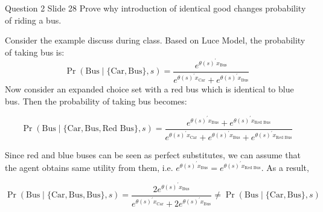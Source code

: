 \documentclass{article}
\begin{document}
\begin{problem}{Question 2 Slide 28}
Prove why introduction of identical good changes probability of riding a bus.
\end{problem}
\begin{solution}
Consider the example discuss during class. Based on Luce Model, the probability of taking bus is:
\begin{equation*}
\operatorname{Pr}(\text{Bus} \mid\{\text{Car},\text{Bus}\}, s)=\frac{e^{\theta(s)^{\prime} x_{\text{Bus}}}}{e^{\theta(s)^{\prime} x_{\text{Car}}}+e^{\theta(s)^{\prime} x_{\text{Bus}}}}
\end{equation*}
Now consider an expanded choice set with a red bus which is identical to blue bus. Then the probability of taking bus becomes:

\begin{equation*}
\operatorname{Pr}(\text{Bus} \mid\{\text{Car},\text{Bus},\text{Red Bus}\}, s)=\frac{e^{\theta(s)^{\prime} x_{\text{Bus}}}+e^{\theta(s)^{\prime} x_{\text{Red Bus}}}}{e^{\theta(s)^{\prime} x_{\text{Car}}}+e^{\theta(s)^{\prime} x_{\text{Bus}}}+e^{\theta(s)^{\prime} x_{\text{Red Bus}}}}
\end{equation*}

Since red and blue buses can be seen as perfect substitutes, we can assume that the agent obtains same utility from them, i.e. $e^{\theta(s)^{\prime} x_{\text{Bus}}}=e^{\theta(s)^{\prime} x_{\text{Red Bus}}}$. As a result,

\begin{equation*}
\operatorname{Pr}(\text{Bus}\mid\{\text{Car},\text{Bus},\text{Bus}\}, s)=\frac{2 e^{\theta(s)^{\prime} x_{\text{Bus}}}}{e^{\theta(s)^{\prime} x_{\text{Car}}}+2 e^{\theta(s)^{\prime} x_{\text{Bus}}}} \neq \operatorname{Pr}(\text{Bus} \mid\{\text{Car},\text{Bus}\}, s)
\end{equation*}
\end{solution}
\end{document}
